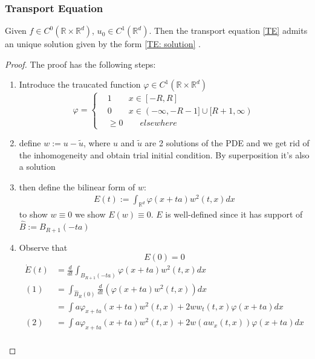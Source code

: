\subsubsection*{Transport Equation}
\begin{theorem}
	Given $f \in C^0(\mathbb{R} \times \mathbb{R}^d)$, $u_0 \in C^1(\mathbb{R}^d)$. Then the transport equation \ref{TE}  admits an unique solution given by the form \ref{TE: solution} .
\end{theorem}
\begin{proof}
	The proof has the following steps:
	\begin{enumerate}
		\item Introduce the traucated function $\varphi \in C^1(\mathbb{R} \times \mathbb{R}^d)$
		\begin{equation*}
			\varphi = 
			\left\{
			\begin{aligned}
				&1 \qquad x \in [-R, R]\\
				&0 \qquad x \in (-\infty, -R-1] \cup [R + 1, \infty)\\
				& \geq 0 \qquad elsewhere
			\end{aligned}
			\right.
		\end{equation*}
		\item 
		define $w := u - \tilde{u}$, where $u$ and $\tilde{u}$ are 2 solutions of the PDE and we get rid of the inhomogeneity    and obtain trial initial condition. By superposition it's also a solution
		\item then define the bilinear form of $w$:
		\begin{align*}
			E(t) := \int_{\mathbb{R}^d} \varphi(x + ta) w^2(t, x) dx
		\end{align*}
		to show $w \equiv 0$ we show $E(w) \equiv 0$. $E$ is well-defined since it has support of $\hat{B}:= B_{R+1}(-ta)$		
		\item Observe that
		\begin{equation*}
			E(0) = 0
		\end{equation*}
		\begin{align*}
			\dot{E}(t) &= \frac{d}{dt} \int_{B_{R+1}(-ta)} \varphi(x + ta) w^2(t, x)dx\\
		 (1)&= \int_{\hat{B}_R(0)} \frac{d}{dt} (\varphi(x+ ta) w^2(t, x)) dx\\
			&= \int a\varphi_{x+ta}(x + ta) w^2(t, x) + 2w w_t(t, x) \varphi(x + ta) dx\\
		 (2)&= \int a \varphi_{x + ta}(x+ta)w^2(t, x) + 2w (aw_x(t, x))\varphi(x+ta) dx\\

\end{align*}
\end{enumerate}
\end{proof}
